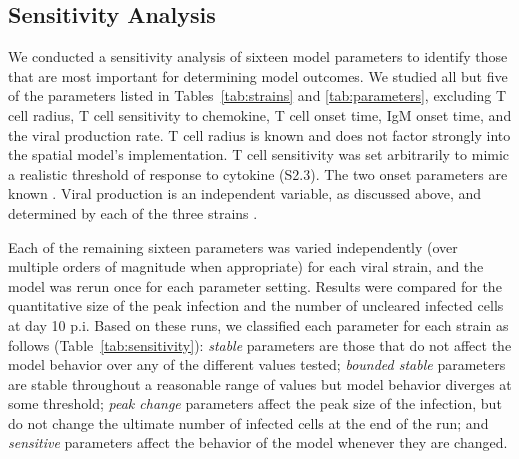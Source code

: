 \documentclass[10pt]{article}
\begin{document}


\subsection*{Sensitivity Analysis}


We conducted a sensitivity analysis of sixteen model parameters to identify those that are most important for determining model outcomes.  We studied all but five of the parameters listed in Tables~\ref{tab:strains} and \ref{tab:parameters}, excluding T cell radius, T cell sensitivity to chemokine, T cell onset time, IgM onset time, and the viral production rate.  T cell radius is known \cite{abbas2011cellular} and does not factor strongly into the spatial model's implementation.  T cell sensitivity was set arbitrarily to mimic a realistic threshold of response to cytokine (S2.3).  The two onset parameters are known \cite{Diamond2003}.  Viral production is an independent variable, as discussed above, and determined by each of the three strains \cite{Mitchell2011}.

Each of the remaining sixteen parameters was varied independently (over multiple orders of magnitude when appropriate) for each viral strain, and the model was rerun once for each parameter setting.  Results were compared for the quantitative size of the peak infection and the number of uncleared infected cells at day 10 p.i.  Based on these runs, we classified each parameter for each strain as follows (Table~\ref{tab:sensitivity}): \textit{stable} parameters are those that do not affect the model behavior over any of the different values tested; \textit{bounded stable} parameters are stable throughout a reasonable range of values but model behavior diverges at some threshold; \textit{peak change} parameters affect the peak size of the infection, but do not change the ultimate number of infected cells at the end of the run; and \textit{sensitive} parameters affect the behavior of the model whenever they are changed.
\end{document}
